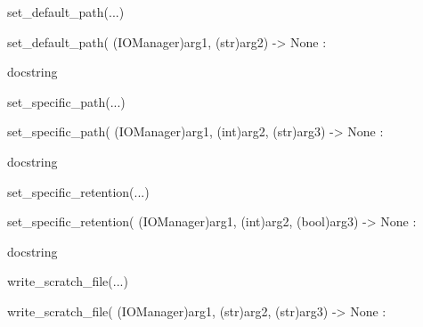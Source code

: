 \documentclass[letterpaper,10pt,english]{sphinxmanual}
\begin{document}
\begin{description}
\begin{description}
\begin{DUlineblock}{0em}
\begin{DUlineblock}{\DUlineblockindent}
\begin{DUlineblock}{\DUlineblockindent}
\item[] 
\end{DUlineblock}
\end{DUlineblock}
\item[] set\_default\_path(...)
\item[]
\begin{DUlineblock}{\DUlineblockindent}
\item[] set\_default\_path( (IOManager)arg1, (str)arg2) -\textgreater{} None :
\item[]
\begin{DUlineblock}{\DUlineblockindent}
\item[] docstring
\item[] 
\end{DUlineblock}
\end{DUlineblock}
\item[] set\_specific\_path(...)
\item[]
\begin{DUlineblock}{\DUlineblockindent}
\item[] set\_specific\_path( (IOManager)arg1, (int)arg2, (str)arg3) -\textgreater{} None :
\item[]
\begin{DUlineblock}{\DUlineblockindent}
\item[] docstring
\item[] 
\end{DUlineblock}
\end{DUlineblock}
\item[] set\_specific\_retention(...)
\item[]
\begin{DUlineblock}{\DUlineblockindent}
\item[] set\_specific\_retention( (IOManager)arg1, (int)arg2, (bool)arg3) -\textgreater{} None :
\item[]
\begin{DUlineblock}{\DUlineblockindent}
\item[] docstring
\item[] 
\end{DUlineblock}
\end{DUlineblock}
\item[] write\_scratch\_file(...)
\item[]
\begin{DUlineblock}{\DUlineblockindent}
\item[] write\_scratch\_file( (IOManager)arg1, (str)arg2, (str)arg3) -\textgreater{} None :
\item[]
\begin{DUlineblock}{\DUlineblockindent}

\end{DUlineblock}
\end{DUlineblock}
\end{DUlineblock}
\end{description}
\end{description}
\end{document}
